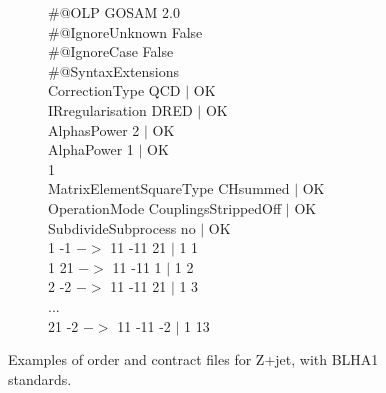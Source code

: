 \begin{figure}[htb!]
\begin{subfigure}[]{0.49\textwidth}
{{\#@OLP GOSAM 2.0\\
\#@IgnoreUnknown False\\
\#@IgnoreCase False\\
\#@SyntaxExtensions \\
CorrectionType QCD $|$ OK\\
IRregularisation DRED $|$ OK\\
AlphasPower 2 $|$ OK\\
AlphaPower  1   $|$ OK\\           1\\
MatrixElementSquareType CHsummed $|$ OK\\
OperationMode CouplingsStrippedOff $|$ OK\\
SubdivideSubprocess  no $|$ OK\\
1 -1 $->$ 11 -11 21 $|$ 1 1\\
1 21 $->$ 11 -11 1  $|$ 1 2\\
2 -2 $->$ 11 -11 21 $|$ 1 3\\
...\\
21 -2 $->$ 11 -11 -2 $|$ 1 13\\}
}
\end{subfigure}
\caption{Examples of order and contract files for Z+jet, with BLHA1 standards.}
\label{fig:BLHA1}
\end{figure}  



